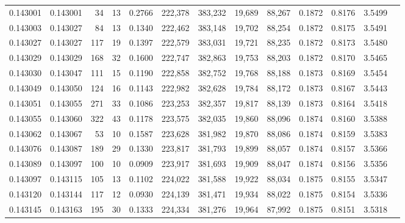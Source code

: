 \begin{tabular}{rrrrrrrrrrrrr}
0.143001 & 0.143001 &    34 &  13 &                                     0.2766 & 222,378 & 383,232 &  19,689 &  88,267 & 0.1872 & 0.8176 & 3.5499 \\
0.143003 & 0.143027 &    84 &  13 &                                     0.1340 & 222,462 & 383,148 &  19,702 &  88,254 & 0.1872 & 0.8175 & 3.5491 \\
0.143027 & 0.143027 &   117 &  19 &                                     0.1397 & 222,579 & 383,031 &  19,721 &  88,235 & 0.1872 & 0.8173 & 3.5480 \\
0.143029 & 0.143029 &   168 &  32 &                                     0.1600 & 222,747 & 382,863 &  19,753 &  88,203 & 0.1872 & 0.8170 & 3.5465 \\
0.143030 & 0.143047 &   111 &  15 &                                     0.1190 & 222,858 & 382,752 &  19,768 &  88,188 & 0.1873 & 0.8169 & 3.5454 \\
0.143049 & 0.143050 &   124 &  16 &                                     0.1143 & 222,982 & 382,628 &  19,784 &  88,172 & 0.1873 & 0.8167 & 3.5443 \\
0.143051 & 0.143055 &   271 &  33 &                                     0.1086 & 223,253 & 382,357 &  19,817 &  88,139 & 0.1873 & 0.8164 & 3.5418 \\
0.143055 & 0.143060 &   322 &  43 &                                     0.1178 & 223,575 & 382,035 &  19,860 &  88,096 & 0.1874 & 0.8160 & 3.5388 \\
0.143062 & 0.143067 &    53 &  10 &                                     0.1587 & 223,628 & 381,982 &  19,870 &  88,086 & 0.1874 & 0.8159 & 3.5383 \\
0.143076 & 0.143087 &   189 &  29 &                                     0.1330 & 223,817 & 381,793 &  19,899 &  88,057 & 0.1874 & 0.8157 & 3.5366 \\
0.143089 & 0.143097 &   100 &  10 &                                     0.0909 & 223,917 & 381,693 &  19,909 &  88,047 & 0.1874 & 0.8156 & 3.5356 \\
0.143097 & 0.143115 &   105 &  13 &                                     0.1102 & 224,022 & 381,588 &  19,922 &  88,034 & 0.1875 & 0.8155 & 3.5347 \\
0.143120 & 0.143144 &   117 &  12 &                                     0.0930 & 224,139 & 381,471 &  19,934 &  88,022 & 0.1875 & 0.8154 & 3.5336 \\
0.143145 & 0.143163 &   195 &  30 &                                     0.1333 & 224,334 & 381,276 &  19,964 &  87,992 & 0.1875 & 0.8151 & 3.5318 \\

\end{tabular}
